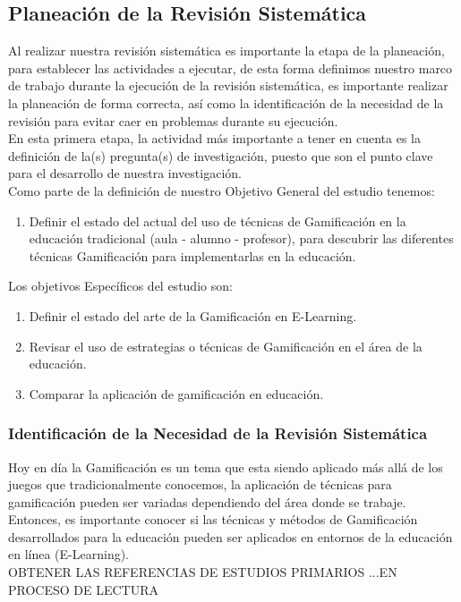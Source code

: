 \documentclass{report}
\begin{document}
    \subsection{Planeación de la Revisión Sistemática}
     Al realizar nuestra revisión sistemática es importante la etapa de la planeación, para establecer las actividades a ejecutar, de esta forma definimos nuestro marco de trabajo durante la ejecución de la revisión sistemática, es importante realizar la planeación de forma correcta, así como la identificación de la necesidad de la revisión para evitar caer en problemas durante su ejecución.\\
    	En esta primera etapa, la actividad más importante a tener en cuenta es la definición de la(s) pregunta(s) de investigación, puesto que son el punto clave para el desarrollo de nuestra investigación.\\
    	Como parte de la definición de nuestro Objetivo General del estudio tenemos:
        \begin{enumerate}
        	\item Definir el estado del actual del uso de técnicas de Gamificación en la educación tradicional (aula - alumno - profesor), para descubrir las diferentes técnicas Gamificación para implementarlas en la educación.
        \end{enumerate}
Los objetivos Específicos del estudio son:
        \begin{enumerate}
        	\item Definir el estado del arte de la Gamificación en E-Learning.
        	\item Revisar el uso de estrategias o técnicas de Gamificación en el área de la educación.
        	\item Comparar la aplicación de gamificación en educación.
        \end{enumerate}

    	    \subsubsection{Identificación de la Necesidad de la Revisión Sistemática} \label{needs}
    	    
            Hoy en día la Gamificación es un tema que esta siendo aplicado más allá de los juegos que tradicionalmente conocemos, la aplicación de técnicas para gamificación pueden ser variadas dependiendo del área donde se trabaje. Entonces, es importante conocer si las técnicas y métodos de Gamificación desarrollados para la educación pueden ser aplicados en entornos de la educación en línea (E-Learning). \\
           OBTENER LAS REFERENCIAS DE ESTUDIOS PRIMARIOS ...EN PROCESO DE LECTURA
            
\end{document}
